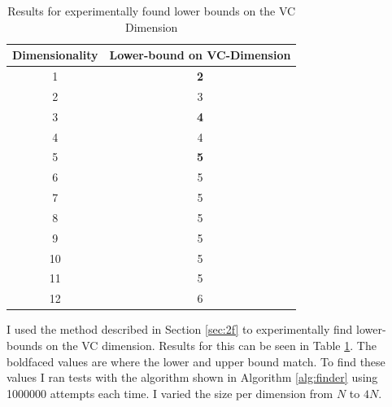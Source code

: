 \documentclass[11pt,a4paper]{article}
\begin{document}
\begin{table}
    \begin{tabular}{|c|c|}
    \hline
    Dimensionality & Lower-bound on VC-Dimension \\ \hline
    1              & \textbf{2}                            \\ \hline
    2              & 3                            \\ \hline
    3              & \textbf{4}                            \\ \hline
    4              & 4                            \\ \hline
    5              & \textbf{5}                            \\ \hline
    6              &    5                         \\ \hline
    7              & 5                           \\ \hline
    8              & 5                            \\ \hline
    9              & 5                            \\ \hline
    10              & 5                            \\ \hline
    11             &  5                          \\ \hline
    12              &  6                           \\ \hline
    \end{tabular}
    \caption{Results for experimentally found lower bounds on the VC Dimension}
    \label{tab:experiment-lower-bound-vc}
\end{table}

I used the method described in Section \ref{sec:2f} to experimentally find lower-bounds on the VC dimension. Results for this can be seen in Table \ref{tab:experiment-lower-bound-vc}. The boldfaced values are where the lower and upper bound match. To find these values I ran tests with the algorithm shown in Algorithm \ref{alg:finder} using 1000000 attempts each time. I varied the size per dimension from $N$ to $4N$.



\end{document}
